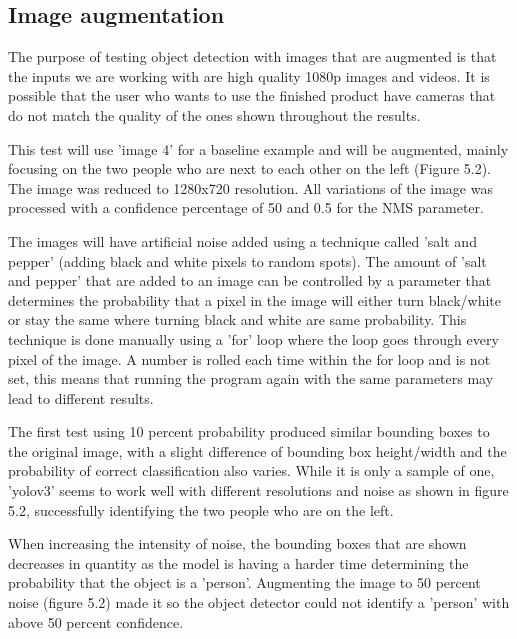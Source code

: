 \documentclass[12pt]{report}
\begin{document}
\subsection{Image augmentation}

The purpose of testing object detection with images that are augmented is that the inputs we are working with are high quality 1080p images and videos. It is possible that the user who wants to use the finished product have cameras that do not match the quality of the ones shown throughout the results.

\vspace{2mm}

This test will use 'image 4' for a baseline example and will be augmented, mainly focusing on the two people who are next to each other on the left (Figure 5.2). The image was reduced to 1280x720 resolution. All variations of the image was processed with a confidence percentage of 50 and 0.5 for the NMS parameter. 

\vspace{2mm}

The images will have artificial noise added using a technique called 'salt and pepper' (adding black and white pixels to random spots). The amount of 'salt and pepper' that are added to an image can be controlled by a parameter that determines the probability that a pixel in the image will either turn black/white or stay the same where turning black and white are same probability. This technique is done manually using a 'for' loop where the loop goes through every pixel of the image. A number is rolled each time within the for loop and is not set, this means that running the program again with the same parameters may lead to different results.

\vspace{2mm}

The first test using 10 percent probability produced similar bounding boxes to the original image, with a slight difference of bounding box height/width and the probability of correct classification also varies. While it is only a sample of one, 'yolov3' seems to work well with different resolutions and noise as shown in figure 5.2, successfully identifying the two people who are on the left.

\vspace{2mm}

When increasing the intensity of noise, the bounding boxes that are shown decreases in quantity as the model is having a harder time determining the probability that the object is a 'person'. Augmenting the image to 50 percent noise (figure 5.2) made it so the object detector could not identify a 'person' with above 50 percent confidence. 
\end{document}
